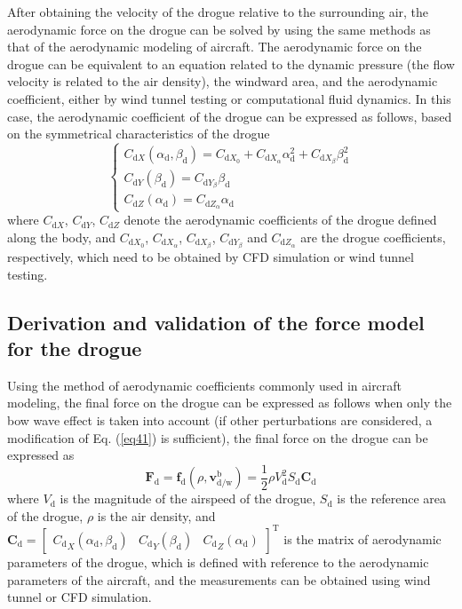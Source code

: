 After obtaining the velocity of the drogue relative to the surrounding air, the aerodynamic force on the drogue can be solved by using the same methods as that of the aerodynamic modeling of aircraft. The aerodynamic force on the drogue can be equivalent to an equation related to the dynamic pressure (the flow velocity is related to the air density), the windward area, and the aerodynamic coefficient, either by wind tunnel testing or computational fluid dynamics. In this case, the aerodynamic coefficient of the drogue can be expressed as follows, based on the symmetrical characteristics of the drogue
\begin{equation}\label{eq43}
\left\{\begin{array}{l}
C_{\mathrm{d} X}\left(\alpha_{\mathrm{d}}, \beta_{\mathrm{d}}\right)=C_{\mathrm{d} X_0}+C_{\mathrm{d} X_\alpha} \alpha_{\mathrm{d}}^2+C_{\mathrm{d} X_\beta} \beta_{\mathrm{d}}^2 \\
C_{\mathrm{d} Y}\left(\beta_{\mathrm{d}}\right)=C_{\mathrm{d} Y_\beta} \beta_{\mathrm{d}} \\
C_{\mathrm{d} Z}\left(\alpha_{\mathrm{d}}\right)=C_{\mathrm{d} Z_\alpha} \alpha_{\mathrm{d}}
\end{array}\right.
\end{equation}
where $C_{\mathrm{d} X}$, $C_{\mathrm{d} Y}$, $C_{\mathrm{d} Z}$ denote the aerodynamic coefficients of the drogue defined along the body, and $C_{\mathrm{d} X_0}$, $C_{\mathrm{d} X_\alpha}$, $C_{\mathrm{d} X_\beta}$, $C_{\mathrm{d} Y_\beta}$ and $C_{\mathrm{d} Z_\alpha}$ are the drogue coefficients, respectively, which need to be obtained by CFD simulation or wind tunnel testing.

\subsection{Derivation and validation of the force model for the drogue}
Using the method of aerodynamic coefficients commonly used in aircraft modeling, the final force on the drogue can be expressed as follows when only the bow wave effect is taken into account (if other perturbations are considered, a modification of Eq. (\ref{eq41}) is sufficient), the final force on the drogue can be expressed as
\begin{equation}\label{eq44}
\mathbf{F}_{\mathrm{d}}=\boldsymbol{f}_{\mathrm{d}}\left(\rho, \mathbf{v}_{\mathrm{d} / \mathrm{w}}^{\mathrm{b}}\right)=\frac{1}{2} \rho V_{\mathrm{d}}^2 S_{\mathrm{d}} \mathbf{C}_{\mathrm{d}}
\end{equation}
where ${V_\mathrm{d}}$ is the magnitude of the airspeed of the drogue, $S_\mathrm{d}$ is the reference area of the drogue, $\rho$ is the air density, and ${\mathbf{C}_\mathrm{d}} = {\left[ {\begin{array}{*{20}{c}}{{C_\mathrm{d}}_X\left( {{\alpha _\mathrm{d}},{\beta _\mathrm{d}}} \right)}&{{C_\mathrm{d}}_Y\left( {{\beta _\mathrm{d}}} \right)}&{{C_\mathrm{d}}_Z\left( {{\alpha _\mathrm{d}}} \right)}\end{array}} \right]^\mathrm{T}}$ is the matrix of aerodynamic parameters of the drogue, which is defined with reference to the aerodynamic parameters of the aircraft, and the measurements can be obtained using wind tunnel or CFD simulation.

